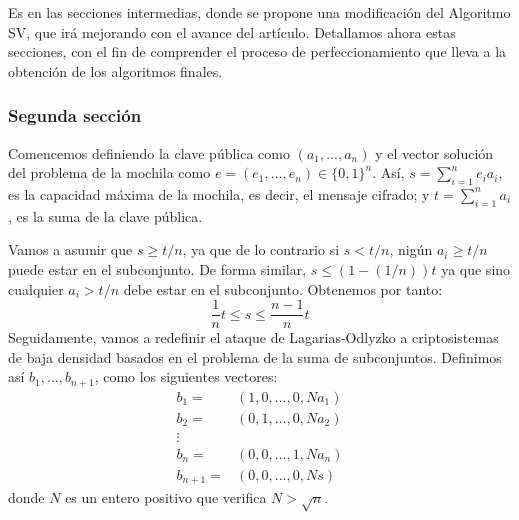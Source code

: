     Es en las secciones intermedias, donde se propone una modificación del Algoritmo SV, que irá mejorando con el avance del artículo. Detallamos ahora estas secciones, con el fin de comprender el proceso de perfeccionamiento que lleva a la obtención de los algoritmos finales.

    \subsubsection{Segunda sección}

    Comencemos definiendo la clave pública como $(a_{1}, ... , a_{n})$ y el vector solución del problema de la mochila como $e = (e_{1}, ... , e_{n}) \in \{0, 1\}^{n}$. Así, $s = \sum_{i=1}^{n} e_{i}a_{i}$, es la capacidad máxima de la mochila, es decir, el mensaje cifrado; y $t = \sum_{i=1}^{n} a_{i}$, es la suma de la clave pública.
    
    Vamos a asumir que $s \geq t/n$, ya que de lo contrario si $s < t/n$, nigún $a_{i} \geq t/n$ puede estar en el subconjunto. De forma similar, $s \leq (1 - (1/n)) t$ ya que sino cualquier $a_{i} > t/n$ debe estar en el subconjunto. Obtenemos por tanto:
    \begin{equation}
        \frac{1}{n}t \leq s \leq \frac{n-1}{n}t
    \end{equation}
    Seguidamente, vamos a redefinir el ataque de Lagarias-Odlyzko a criptosistemas de baja densidad basados en el problema de la suma de subconjuntos. Definimos así $b_{1}, ... , b_{n+1}$, como los siguientes vectores:
    \begin{align}
        b_{1} =& (1, 0, ... , 0, Na_{1}) \\
        b_{2} =& (0, 1, ... , 0, Na_{2}) \\
        \vdots&                          \\
        b_{n} =& (0, 0, ... , 1, Na_{n}) \\
        b_{n+1} =& (0, 0, ... , 0, Ns)
    \end{align}
    donde $N$ es un entero positivo que verifica $N > \sqrt{n}$. 
    
